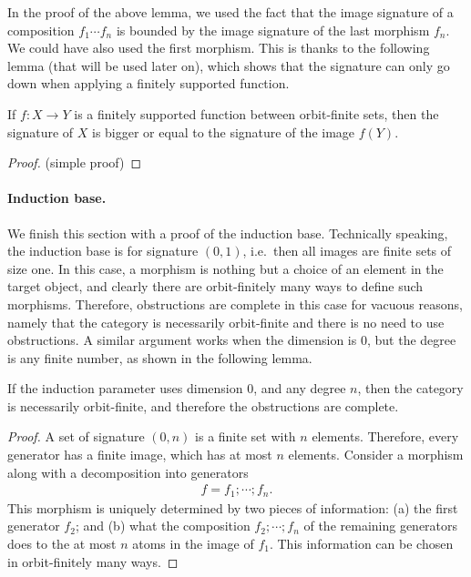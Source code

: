 In the proof of the above lemma, we used the fact that the image signature of a composition $f_1 \cdots f_n$ is bounded by the image signature of the last morphism $f_n$. We could have also used the first morphism. This is thanks to the following lemma (that will be used later on), which shows that the signature can only go down when applying  a finitely supported function. 
\begin{lemma}\label{lem:signature-decrease-across-functions}
    If $f : X \to Y$ is a finitely supported function between orbit-finite sets, then the signature of $X$ is  bigger or equal to the signature of the image $f(Y)$.
\end{lemma}
\begin{proof}
    (simple proof)
\end{proof}




\paragraph*{Induction base.}
We finish this section with a proof of the induction base. Technically speaking, the induction base is for signature $(0,1)$, i.e.~then all images are finite sets of size one. In this case, a morphism is nothing but a choice of an element in the target object, and clearly there are orbit-finitely many ways to define such morphisms. Therefore, obstructions are complete in this case for vacuous reasons, namely that the category is necessarily orbit-finite and there is no need to use obstructions. 
A similar argument works when the dimension is $0$, but the degree is any finite number, as shown in the following lemma. 
\begin{lemma}\label{lem:induction-basis}
        If the induction parameter uses dimension $0$, and any degree $n$, then the category is necessarily orbit-finite, and therefore the obstructions are complete.
\end{lemma}
\begin{proof}
    A set of signature $(0,n)$ is a finite set with $n$ elements. Therefore, every generator has a finite image, which has at most $n$ elements. Consider a morphism along with a decomposition into generators
    \begin{align*}
     f = f_1; \cdots ; f_n.     
    \end{align*}
    This morphism is uniquely determined by two pieces of information: (a) the first generator $f_2$; and (b) what the composition $f_2;\cdots ; f_n$ of the remaining generators does to the at most $n$ atoms in the image of $f_1$. This information can be chosen in orbit-finitely many ways. 
\end{proof}

